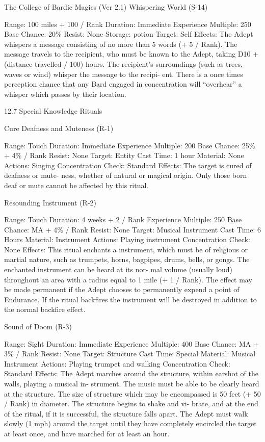\begin{Chapter}{The College of Bardic Magics (Ver 2.1)}
Whispering World (S-14) 

Range: 100 miles + 100 / Rank 
Duration: Immediate 
Experience Multiple: 250 
Base Chance: 20\% 
Resist: None 
Storage: potion 
Target: Self 
Effects:  The  Adept  whispers  a  message  consisting 
of no more than 5 words (+ 5 / Rank). The message 
travels to the recipient, who must be known to the 
Adept,  taking  D10  +  (distance  travelled  /  100) 
hours.  The  recipient’s  surroundings  (such  as trees, 
waves or  wind) whisper the message to the recipi-
ent.  There  is  a  once  times  perception  chance  that 
any Bard engaged in concentration will “overhear” 
a whisper which passes by their location. 

12.7 Special Knowledge Rituals  

Cure Deafness and Muteness (R-1)  

Range: Touch 
Duration: Immediate 
Experience Multiple: 200 
Base Chance: 25\% + 4\% / Rank 
Resist: None 
Target: Entity 
Cast Time: 1 hour 
Material: None 
Actions: Singing 
Concentration Check: Standard 
Effects:  The  target  is  cured  of  deafness  or  mute-
ness,  whether  of  natural  or  magical  origin.  Only 
those born deaf or mute cannot be affected by this 
ritual. 

Resounding Instrument (R-2) 

Range: Touch 
Duration: 4 weeks + 2 / Rank 
Experience Multiple: 250 
Base Chance: MA + 4\% / Rank 
Resist: None 
Target: Musical Instrument 
Cast Time: 6 Hours 
Material: Instrument 
Actions: Playing instrument  
Concentration Check: None 
Effects:  This  ritual  enchants  a  instrument,  which 
must  be  of  religious  or  martial  nature,  such  as 
trumpets,  horns,  bagpipes,  drums,  bells,  or  gongs. 
The  enchanted  instrument  can  be  heard  at  its  nor-
mal volume (usually loud) throughout an area with 
a  radius  equal  to  1  mile  (+  1  /  Rank).  The  effect 
may  be  made  permanent  if  the  Adept  chooses  to 
permanently  expend  a  point  of  Endurance.  If  the 
ritual backfires the instrument will be destroyed in 
addition to the normal backfire effect. 

Sound of Doom (R-3) 

Range: Sight 
Duration: Immediate 
Experience Multiple: 400 
Base Chance: MA + 3\% / Rank 
Resist: None 
Target: Structure 
Cast Time: Special 
Material: Musical Instrument 
Actions: Playing trumpet and walking 
Concentration Check: Standard 
Effects:  The  Adept  marches  around  the  structure, 
within  earshot  of  the  walls,  playing  a  musical  in-
strument.  The  music  must  be  able  to  be  clearly 
heard  at  the  structure.  The  size  of  structure  which 
may  be  encompassed  is  50  feet  (+  50  /  Rank)  in 
diameter.  The  structure  begins  to  shake  and  vi-
brate, and at the end of the ritual, if it is successful, 
the  structure  falls  apart.  The  Adept  must  walk 
slowly  (1  mph)  around  the  target  until  they  have 
completely  encircled  the  target  at  least  once,  and 
have marched for at least an hour. 


\end{Chapter}
